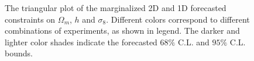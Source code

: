 \documentclass[prd,nofootinbib,showpacs]{revtex4}
\begin{document}
\begin{figure}[h!]
\begin{center}
\hspace{5mm}
\caption{The triangular plot of the marginalized 2D and 1D forecasted constraints on $\Omega_m$, $h$ and $\sigma_8$. Different colors correspond to different combinations of experiments, as shown in legend. The darker and lighter color shades indicate the forecasted $68\%$ C.L. and $95\%$ C.L. bounds.}\label{fig:triplot}
\end{center}
\end{figure}
\end{document}
